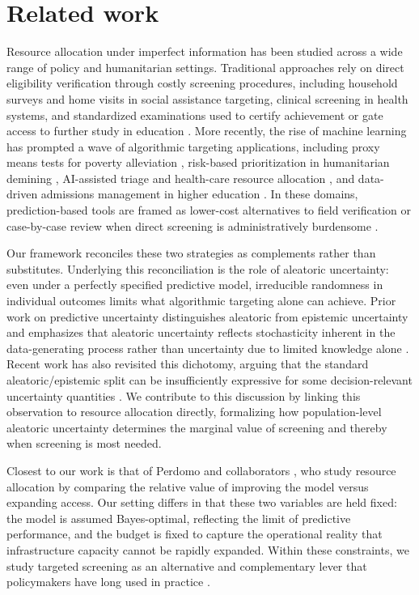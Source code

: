 \section{Related work}

Resource allocation under imperfect information has been studied across a wide range of policy and humanitarian settings. Traditional approaches rely on direct eligibility verification through costly screening procedures, including household surveys and home visits in social assistance targeting, clinical screening in health systems, and standardized examinations used to certify achievement or gate access to further study in education \cite{Harutyunyan2023OperationalEfficiency, who2020screening,hill2010examination}. More recently, the rise of machine learning has prompted a wave of algorithmic targeting applications, including proxy means tests for poverty alleviation \cite{grosh1995proxy,aiken2022machine}, risk-based prioritization in humanitarian demining \cite{dulce2024reland, cirillo2024desk}, AI-assisted triage and health-care resource allocation \cite{wu2023aihealth,grandclement2024ventilator}, and data-driven admissions management in higher education \cite{liu2025mladmission}. In these domains, prediction-based tools are framed as lower-cost alternatives to field verification or case-by-case review when direct screening is administratively burdensome \cite{grosh1995proxy,dulce2024reland}.

Our framework reconciles these two strategies as complements rather than substitutes. Underlying this reconciliation is the role of aleatoric uncertainty: even under a perfectly specified predictive model, irreducible randomness in individual outcomes limits what algorithmic targeting alone can achieve. Prior work on predictive uncertainty distinguishes aleatoric from epistemic uncertainty and emphasizes that aleatoric uncertainty reflects stochasticity inherent in the data-generating process rather than uncertainty due to limited knowledge alone \cite{kendall2017uncertainties,hullermeier2021aleatoric}. Recent work has also revisited this dichotomy, arguing that the standard aleatoric/epistemic split can be insufficiently expressive for some decision-relevant uncertainty quantities \cite{bickfordsmith2025rethinking}. We contribute to this discussion by linking this observation to resource allocation directly, formalizing how population-level aleatoric uncertainty determines the marginal value of screening and thereby when screening is most needed.

Closest to our work is that of Perdomo and collaborators \cite{fischer2025value,perdomo2023relative}, who study resource allocation by comparing the relative value of improving the model versus expanding access. Our setting differs in that these two variables are held fixed: the model is assumed Bayes-optimal, reflecting the limit of predictive performance, and the budget is fixed to capture the operational reality that infrastructure capacity cannot be rapidly expanded. Within these constraints, we study targeted screening as an alternative and complementary lever that policymakers have long used in practice \cite{grosh1995proxy,who2020screening}. 


